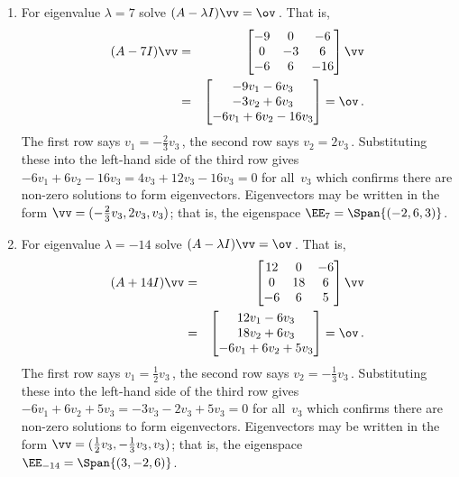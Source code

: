 \begin{example}
\begin{solution}
\begin{enumerate}
\begin{enumerate}
\item For eigenvalue \(\lambda=7\) solve \((A-\lambda I)\vv=\ov\)\,.  
That is,
\begin{eqnarray*}
(A-7I)\vv&=&\begin{bmatrix} -9&0&-6\\0&-3&6\\-6&6&-16 \end{bmatrix}\vv
\\&=&\begin{bmatrix} -9v_1-6v_3\\-3v_2+6v_3\\-6v_1+6v_2-16v_3 \end{bmatrix}=\ov\,.
\end{eqnarray*}
The first row says \(v_1=-\frac23v_3\)\,, 
the second row says \(v_2=2v_3\)\,.  
Substituting these into the left-hand side of the third row gives
\(-6v_1+6v_2-16v_3=4v_3+12v_3-16v_3=0\) for all~\(v_3\) which confirms there are non-zero solutions to form eigenvectors.
Eigenvectors may be written in the form 
\(\vv=(-\frac23v_3,2v_3,v_3)\); that is, the eigenspace \(\EE_7=\Span\{(-2,6,3)\}\).

\item For eigenvalue \(\lambda=-14\) solve \((A-\lambda I)\vv=\ov\)\,.  
That is,
\begin{eqnarray*}
(A+14I)\vv&=&\begin{bmatrix} 12&0&-6\\0&18&6\\-6&6&5 \end{bmatrix}\vv
\\&=&\begin{bmatrix} 12v_1-6v_3\\18v_2+6v_3\\-6v_1+6v_2+5v_3 \end{bmatrix}=\ov\,.
\end{eqnarray*}
The first row says \(v_1=\frac12v_3\)\,, 
the second row says \(v_2=-\frac13v_3\)\,.  
Substituting these into the left-hand side of the third row gives
\(-6v_1+6v_2+5v_3=-3v_3-2v_3+5v_3=0\) for all~\(v_3\) which confirms there are non-zero solutions to form eigenvectors.
Eigenvectors may be written in the form 
\(\vv=(\frac12v_3,-\frac13v_3,v_3)\); 
that is, the eigenspace \(\EE_{-14}=\Span\{(3,-2,6)\}\).

\end{enumerate}
\end{enumerate}
\end{solution}
\end{example}



